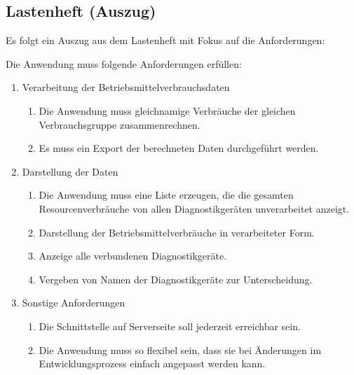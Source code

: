 \subsection{Lastenheft (Auszug)}
\label{app:Lastenheft}
Es folgt ein Auszug aus dem Lastenheft mit Fokus auf die Anforderungen:

Die Anwendung muss folgende Anforderungen erfüllen:
\begin{enumerate}[itemsep=0em,partopsep=0em,parsep=0em,topsep=0em]
	\item Verarbeitung der Betriebsmittelverbrauchsdaten
	\begin{enumerate}
		\item Die Anwendung muss gleichnamige Verbräuche der gleichen Verbrauchsgruppe zusammenrechnen.
		\item Es muss ein Export der berechneten Daten durchgeführt werden.
	\end{enumerate}
	\item Darstellung der Daten
	\begin{enumerate}
		\item Die Anwendung muss eine Liste erzeugen, die die gesamten Resourcenverbräuche von allen Diagnostikgeräten unverarbeitet anzeigt.
		\item Darstellung der Betriebsmittelverbräuche in verarbeiteter Form.
		\item Anzeige alle verbundenen Diagnostikgeräte.
		\item Vergeben von Namen der Diagnostikgeräte zur Unterscheidung.
	\end{enumerate}
	\item Sonstige Anforderungen
	\begin{enumerate}
		\item Die Schnittstelle auf Serverseite soll jederzeit erreichbar sein.
		\item Die Anwendung muss so flexibel sein, dass sie bei Änderungen im Entwicklungsprozess einfach angepasst werden kann.
	\end{enumerate}
\end{enumerate}
